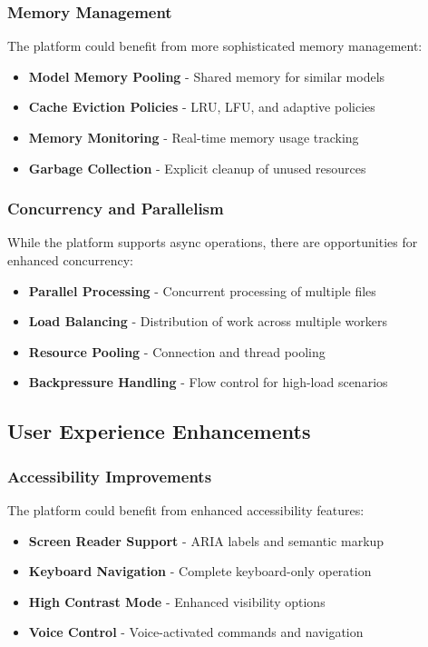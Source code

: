 \documentclass[11pt]{article}
\begin{document}
\subsubsection{Memory Management}

The platform could benefit from more sophisticated memory management:

\begin{itemize}
\item \textbf{Model Memory Pooling} - Shared memory for similar models
\item \textbf{Cache Eviction Policies} - LRU, LFU, and adaptive policies
\item \textbf{Memory Monitoring} - Real-time memory usage tracking
\item \textbf{Garbage Collection} - Explicit cleanup of unused resources
\end{itemize}

\subsubsection{Concurrency and Parallelism}

While the platform supports async operations, there are opportunities for enhanced concurrency:

\begin{itemize}
\item \textbf{Parallel Processing} - Concurrent processing of multiple files
\item \textbf{Load Balancing} - Distribution of work across multiple workers
\item \textbf{Resource Pooling} - Connection and thread pooling
\item \textbf{Backpressure Handling} - Flow control for high-load scenarios
\end{itemize}

\subsection{User Experience Enhancements}

\subsubsection{Accessibility Improvements}

The platform could benefit from enhanced accessibility features:

\begin{itemize}
\item \textbf{Screen Reader Support} - ARIA labels and semantic markup
\item \textbf{Keyboard Navigation} - Complete keyboard-only operation
\item \textbf{High Contrast Mode} - Enhanced visibility options
\item \textbf{Voice Control} - Voice-activated commands and navigation
\end{itemize}
\end{document}
